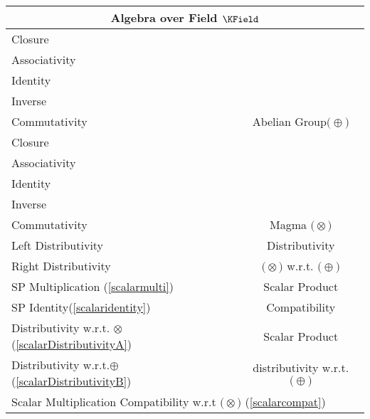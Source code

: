 \documentclass[a4paper,12pt]{scrartcl}    %
\newcommand{\OpA}{\otimes}
\newcommand{\OpB}{\oplus}
\begin{document}
\begin{minipage}[c]{0,5\textwidth}

\begin{tabular}{|l|c|} %
  \hline
  \multicolumn{2}{c}{\cellcolor{green!25}Algebra over Field $\KField$} \\
  \hline
    \cellcolor{blue!25} \footnotesize Closure& \cellcolor{yellow!25}  \\
    \cellcolor{blue!25} \footnotesize Associativity& \cellcolor{yellow!25}  \\
    \cellcolor{blue!25} \footnotesize Identity& \cellcolor{yellow!25} \\
    \cellcolor{blue!25} \footnotesize Inverse& \cellcolor{yellow!25} \\
    \cellcolor{blue!25} \footnotesize Commutativity& \multirow{-5}{*}{\tiny\cellcolor{yellow!25}Abelian Group$\big(\OpB\big)$} \\
   \hline
    \cellcolor{blue!25} \footnotesize Closure& \cellcolor{yellow!25}  \\
    \cellcolor{red!25} \footnotesize Associativity& \cellcolor{yellow!25}  \\
    \cellcolor{red!25} \footnotesize Identity& \cellcolor{yellow!25} \\
    \cellcolor{red!25} \footnotesize Inverse& \cellcolor{yellow!25} \\
    \cellcolor{red!25} \footnotesize Commutativity& \multirow{-5}{*}{\tiny\cellcolor{yellow!25} Magma $\big(\OpA\big)$} \\
  \hline
  	\cellcolor{blue!25} \footnotesize Left Distributivity&  \tiny\cellcolor{yellow!25}Distributivity\\
    \cellcolor{blue!25} \footnotesize Right Distributivity & \tiny\cellcolor{yellow!25} $\big(\OpA\big)$ w.r.t. $\big(\OpB\big)$  \\
   \hline
  \hline
     \cellcolor{blue!25} \footnotesize SP Multiplication (\ref{scalarmulti})&  \tiny\cellcolor{yellow!25}Scalar Product\\
    \cellcolor{blue!25} \footnotesize SP Identity(\ref{scalaridentity}) & \tiny\cellcolor{yellow!25} Compatibility  \\
   \hline 
    \cellcolor{blue!25} \footnotesize Distributivity w.r.t. $\OpA$ (\ref{scalarDistributivityA})&  \tiny\cellcolor{yellow!25}Scalar Product\\
    \cellcolor{blue!25} \footnotesize Distributivity w.r.t.$\OpB$ (\ref{scalarDistributivityB}) & \tiny\cellcolor{yellow!25} distributivity w.r.t. $\big(\OpB\big)$  \\
   \hline
    \multicolumn{2}{l}{\footnotesize \cellcolor{blue!25} Scalar Multiplication Compatibility w.r.t  $\big(\OpA\big)$ (\ref{scalarcompat})}\\
   \hline
\end{tabular}


\end{minipage}
\end{document}
